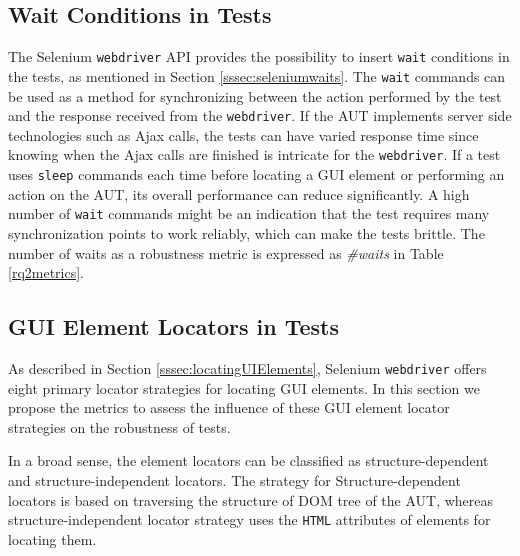 \subsection{Wait Conditions in Tests}
\label{selenium-waits-metric}
The Selenium \texttt{webdriver} API provides the possibility to insert \texttt{wait} conditions in the tests, as mentioned in Section \ref{sssec:seleniumwaits}. The \texttt{wait} commands can be used as a method for synchronizing between the action performed by the test and the response received from the \texttt{webdriver}. If the AUT implements server side technologies such as Ajax calls, the tests can have varied response time since knowing when the Ajax calls are finished is intricate for the \texttt{webdriver}. If a test uses \texttt{sleep} commands each time before locating a GUI element or performing an action on the AUT, its overall performance can reduce significantly. A high number of \texttt{wait} commands might be an indication that the test requires many synchronization points to work reliably, which can make the tests brittle. The number of waits as a robustness metric is expressed as \textit{\#waits} in Table \ref{rq2metrics}.

\subsection{GUI Element Locators in Tests}
As described in Section \ref{sssec:locatingUIElements}, Selenium \texttt{webdriver} offers eight primary locator strategies for locating GUI elements. In this section we propose the metrics to assess the influence of these GUI element locator strategies on the robustness of tests.

In a broad sense, the element locators can be classified as structure-dependent and structure-independent locators. The strategy for Structure-dependent locators is based on traversing the structure of DOM tree of the AUT, whereas structure-independent locator strategy uses the \texttt{HTML} attributes of elements for locating them. 

